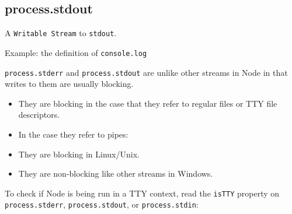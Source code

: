 \subsection{process.stdout}\label{process.stdout}

A \texttt{Writable Stream} to \texttt{stdout}.

Example: the definition of \texttt{console.log}

\begin{Shaded}
\begin{Highlighting}[]
 \NormalTok{= }
  \NormalTok{);}
\NormalTok{\};}
\end{Highlighting}
\end{Shaded}

\texttt{process.stderr} and \texttt{process.stdout} are unlike other
streams in Node in that writes to them are usually blocking.

\begin{itemize}
\itemsep1pt\parskip0pt
\item
  They are blocking in the case that they refer to regular files or TTY
  file descriptors.
\item
  In the case they refer to pipes:
\item
  They are blocking in Linux/Unix.
\item
  They are non-blocking like other streams in Windows.
\end{itemize}

To check if Node is being run in a TTY context, read the \texttt{isTTY}
property on \texttt{process.stderr}, \texttt{process.stdout}, or
\texttt{process.stdin}:

\begin{Shaded}
\begin{Highlighting}[]
 

 
\end{Highlighting}
\end{Shaded}

